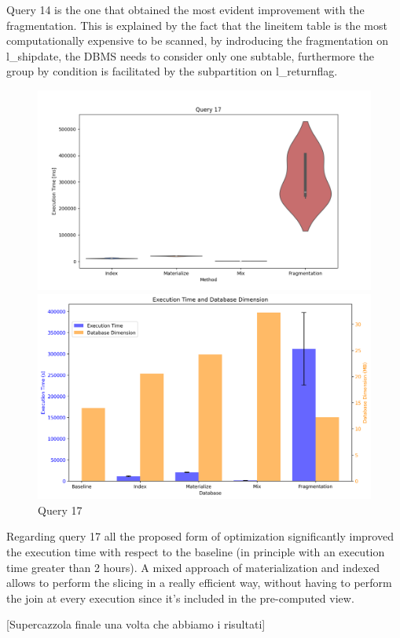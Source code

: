 Query 14 is the one that obtained the most evident improvement with the fragmentation. This is explained by the fact that the lineitem table is the most computationally expensive to be scanned, by indroducing the fragmentation on l\_shipdate, the DBMS needs to consider only one subtable, furthermore the group by condition is facilitated by the subpartition on l\_returnflag.
\begin{figure}[h!] 
\centering 
\begin{minipage}{0.5\textwidth} 
\centering \includegraphics[width=\linewidth]{images/query17.png}  
\end{minipage}
\begin{minipage}{0.45\textwidth} 
\centering 
\includegraphics[width=\linewidth]{images/double_barplot_q17.png} 
\end{minipage} 
\caption{Query 17} 
\end{figure}

Regarding query 17 all the proposed form of optimization significantly improved the execution time with respect to the baseline (in principle with an execution time greater than 2 hours). A mixed approach of materialization and indexed allows to perform the slicing in a really efficient way, without having to perform the join at every execution since it's included in the pre-computed view.  


[Supercazzola finale una volta che abbiamo i risultati]